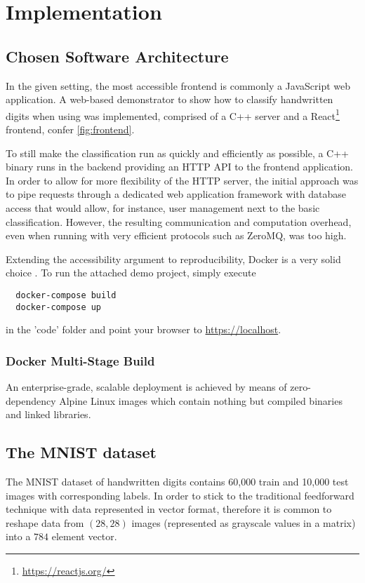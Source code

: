 \chapter{Implementation}
\label{chap:implementation}

\section{Chosen Software Architecture}
In the given setting, the most accessible frontend is commonly a JavaScript web application.
A web-based demonstrator to show how to classify handwritten digits when using  was implemented, comprised of a C++ server and a React\footnote{\url{https://reactjs.org/}} frontend, confer \cref{fig:frontend}.

To still make the classification run as quickly and efficiently as possible, a C++ binary runs in the backend providing an HTTP API to the frontend application.
In order to allow for more flexibility of the HTTP server, the initial approach was to pipe requests through a dedicated web application framework with database access that would allow, for instance, user management next to the basic classification.
However, the resulting communication and computation overhead, even when running with very efficient protocols such as ZeroMQ, was too high.

Extending the accessibility argument to reproducibility, Docker is a very solid choice \parencite{using-docker-in-science}.
To run the attached demo project, simply execute
\begin{verbatim}
  docker-compose build
  docker-compose up
\end{verbatim}
in the 'code' folder and point your browser to \url{https://localhost}.


\subsection{Docker Multi-Stage Build}
An enterprise-grade, scalable deployment is achieved by means of zero-dependency
Alpine Linux images which contain nothing but compiled binaries and linked libraries.

\section{The MNIST dataset}
The MNIST dataset of handwritten digits \parencite{mnist-original} contains 60,000 train and 10,000 test images with corresponding labels.
In order to stick to the traditional feedforward technique with data represented in vector format, therefore it is common to reshape data from $(28, 28)$ images (represented as grayscale values in a matrix)
into a $784$ element vector.

